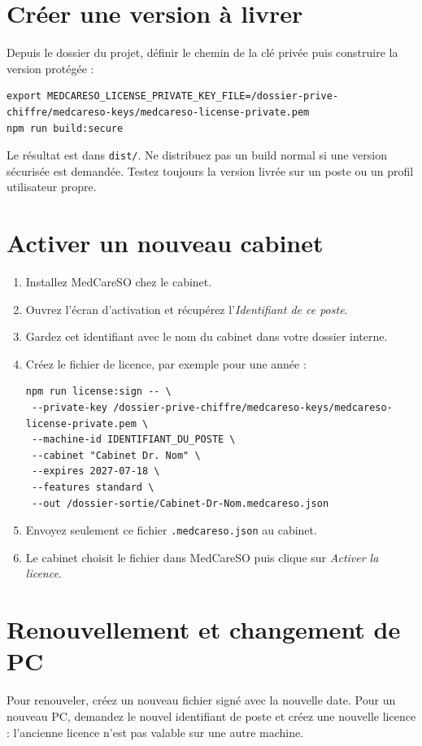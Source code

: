 \documentclass[11pt,a4paper]{article}
\begin{document}
\section{Créer une version à livrer}
Depuis le dossier du projet, définir le chemin de la clé privée puis construire
la version protégée :
\begin{verbatim}
export MEDCARESO_LICENSE_PRIVATE_KEY_FILE=/dossier-prive-chiffre/medcareso-keys/medcareso-license-private.pem
npm run build:secure
\end{verbatim}
Le résultat est dans \texttt{dist/}. Ne distribuez pas un build normal si une
version sécurisée est demandée. Testez toujours la version livrée sur un poste
ou un profil utilisateur propre.

\section{Activer un nouveau cabinet}
\begin{enumerate}[label=\arabic*.]
\item Installez MedCareSO chez le cabinet.
\item Ouvrez l'écran d'activation et récupérez l'\emph{Identifiant de ce poste}.
\item Gardez cet identifiant avec le nom du cabinet dans votre dossier interne.
\item Créez le fichier de licence, par exemple pour une année :
\begin{verbatim}
npm run license:sign -- \
 --private-key /dossier-prive-chiffre/medcareso-keys/medcareso-license-private.pem \
 --machine-id IDENTIFIANT_DU_POSTE \
 --cabinet "Cabinet Dr. Nom" \
 --expires 2027-07-18 \
 --features standard \
 --out /dossier-sortie/Cabinet-Dr-Nom.medcareso.json
\end{verbatim}
\item Envoyez seulement ce fichier \texttt{.medcareso.json} au cabinet.
\item Le cabinet choisit le fichier dans MedCareSO puis clique sur
\emph{Activer la licence}.
\end{enumerate}

\section{Renouvellement et changement de PC}
Pour renouveler, créez un nouveau fichier signé avec la nouvelle date. Pour un
nouveau PC, demandez le nouvel identifiant de poste et créez une nouvelle
licence : l'ancienne licence n'est pas valable sur une autre machine.
\end{document}
